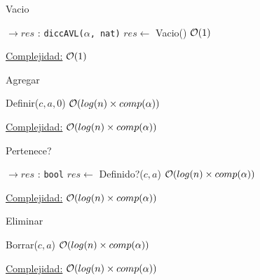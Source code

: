 \begin{Algoritmos}

\begin{algorithm}
\caption{Vacio}
\begin{algorithmic}[1]
$\to res$ : \texttt{diccAVL($\alpha$, nat)}
	\State $res \gets$ Vacio()
	\Comment $\mathcal{O}(1)$
\EndProcedure
\end{algorithmic}
\underline{Complejidad:} $\mathcal{O}(1)$
\end{algorithm}

\begin{algorithm}
\caption{Agregar}
\begin{algorithmic}[1]
	\State Definir($c, a, 0$)
	\Comment $\mathcal{O}(log(n) \times comp(\alpha))$
\EndProcedure
\end{algorithmic}
\underline{Complejidad:} $\mathcal{O}(log(n) \times comp(\alpha))$
\end{algorithm}

\begin{algorithm}
\caption{Pertenece?}
\begin{algorithmic}[1]
$\to res$ : \texttt{bool}
	\State $res \gets$ Definido?($c, a$)
	\Comment $\mathcal{O}(log(n) \times comp(\alpha))$
\EndProcedure
\end{algorithmic}
\underline{Complejidad:} $\mathcal{O}(log(n) \times comp(\alpha))$
\end{algorithm}

\begin{algorithm}
\caption{Eliminar}
\begin{algorithmic}[1]
	\State Borrar($c, a$)
	\Comment $\mathcal{O}(log(n) \times comp(\alpha))$
\EndProcedure
\end{algorithmic}
\underline{Complejidad:} $\mathcal{O}(log(n) \times comp(\alpha))$
\end{algorithm}
\end{Algoritmos}